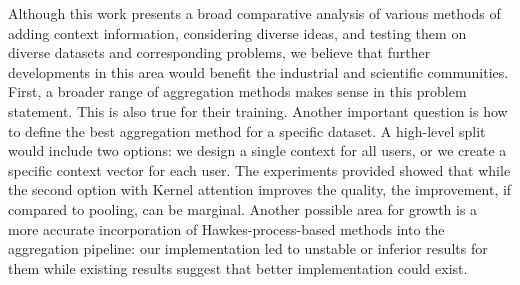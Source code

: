 Although this work presents a broad comparative analysis of various methods of adding context information, considering diverse ideas, and testing them on diverse datasets and corresponding problems, we believe that further developments in this area would benefit the industrial and scientific communities.
First, a broader range of aggregation methods makes sense in this problem statement. 
This is also true for their training.
Another important question is how to define the best aggregation method for a specific dataset.
A high-level split would include two options: we design a single context for all users, or we create a specific context vector for each user. 
The experiments provided showed that while the second option with Kernel attention improves the quality, the improvement, if compared to pooling, can be marginal.
Another possible area for growth is a more accurate incorporation of Hawkes-process-based methods into the aggregation pipeline: our implementation led to unstable or inferior results for them while existing results suggest that better implementation could exist.
